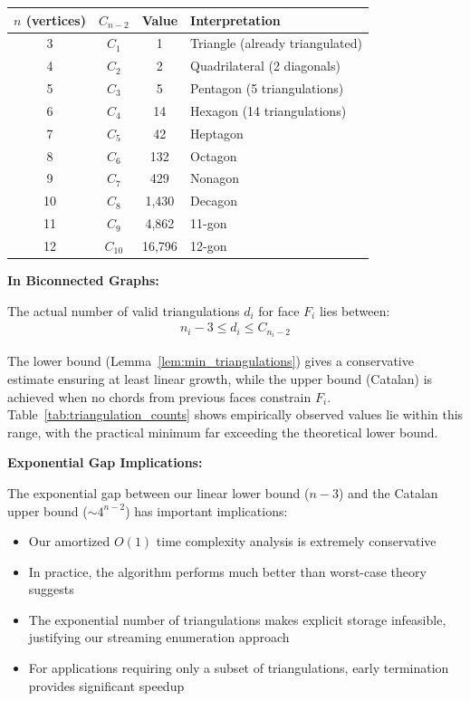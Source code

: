 \documentclass[12pt,a4paper]{article}
\theoremstyle{definition}
\theoremstyle{remark}
\begin{document}
\begin{center}
\begin{tabular}{c|c|c|l}
\textbf{$n$ (vertices)} & \textbf{$C_{n-2}$} & \textbf{Value} & \textbf{Interpretation} \\
\hline
3 & $C_1$ & 1 & Triangle (already triangulated) \\
4 & $C_2$ & 2 & Quadrilateral (2 diagonals) \\
5 & $C_3$ & 5 & Pentagon (5 triangulations) \\
6 & $C_4$ & 14 & Hexagon (14 triangulations) \\
7 & $C_5$ & 42 & Heptagon \\
8 & $C_6$ & 132 & Octagon \\
9 & $C_7$ & 429 & Nonagon \\
10 & $C_8$ & 1,430 & Decagon \\
11 & $C_9$ & 4,862 & 11-gon \\
12 & $C_{10}$ & 16,796 & 12-gon \\
\end{tabular}
\end{center}

\textbf{In Biconnected Graphs:}

The actual number of valid triangulations $d_i$ for face $F_i$ lies between:
\begin{align}
n_i - 3 \leq d_i \leq C_{n_i - 2}
\end{align}

The lower bound (Lemma~\ref{lem:min_triangulations}) gives a conservative estimate ensuring at least linear growth, while the upper bound (Catalan) is achieved when no chords from previous faces constrain $F_i$. Table~\ref{tab:triangulation_counts} shows empirically observed values lie within this range, with the practical minimum far exceeding the theoretical lower bound.

\textbf{Exponential Gap Implications:}

The exponential gap between our linear lower bound ($n-3$) and the Catalan upper bound ($\sim 4^{n-2}$) has important implications:
\begin{itemize}
    \item Our amortized $O(1)$ time complexity analysis is extremely conservative
    \item In practice, the algorithm performs much better than worst-case theory suggests
    \item The exponential number of triangulations makes explicit storage infeasible, justifying our streaming enumeration approach
    \item For applications requiring only a subset of triangulations, early termination provides significant speedup
\end{itemize}
\end{document}

